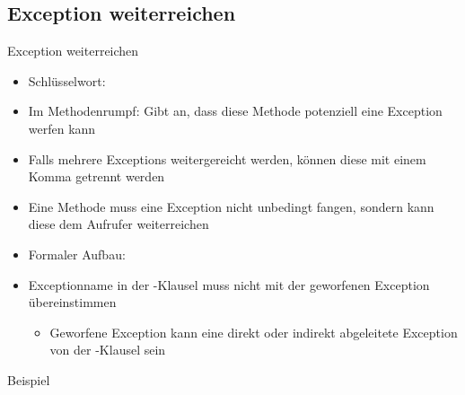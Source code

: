 \documentclass{../tuda-beamer}
\begin{document}
    \subsection{Exception weiterreichen}
    \label{subsec:exception-weiterreichen}
    \begin{frame}{Exception weiterreichen}
        \begin{itemize}
            \item Schlüsselwort: 
            \item Im Methodenrumpf: Gibt an, dass diese Methode potenziell eine Exception werfen
            kann
            \item Falls mehrere Exceptions weitergereicht werden, können diese mit einem Komma
            getrennt werden
            \item Eine Methode muss eine Exception nicht unbedingt fangen, sondern kann diese dem
            Aufrufer weiterreichen
            \item Formaler Aufbau:

            \begin{center}
            \end{center}
            \item Exceptionname in der -Klausel muss nicht mit der geworfenen
            Exception übereinstimmen

            \begin{itemize}
                \item Geworfene Exception kann eine direkt oder indirekt abgeleitete Exception
                von der -Klausel sein
            \end{itemize}
        \end{itemize}
    \end{frame}

    \begin{frame}[c]{Beispiel}
        
    \end{frame}
\end{document}
